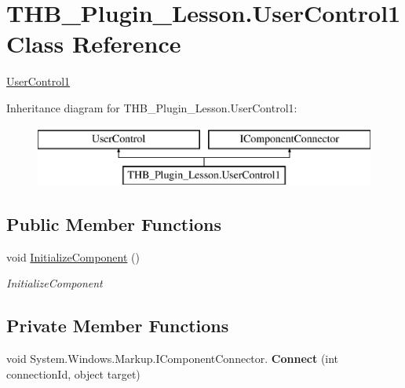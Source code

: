 \hypertarget{class_t_h_b___plugin___lesson_1_1_user_control1}{}\section{T\+H\+B\+\_\+\+Plugin\+\_\+\+Lesson.\+User\+Control1 Class Reference}
\label{class_t_h_b___plugin___lesson_1_1_user_control1}


\mbox{\hyperlink{class_t_h_b___plugin___lesson_1_1_user_control1}{User\+Control1}}  


Inheritance diagram for T\+H\+B\+\_\+\+Plugin\+\_\+\+Lesson.\+User\+Control1\+:\begin{figure}[H]
\begin{center}
\leavevmode
\includegraphics[height=2.000000cm]{d4/dec/class_t_h_b___plugin___lesson_1_1_user_control1}
\end{center}
\end{figure}
\subsection*{Public Member Functions}
\begin{DoxyCompactItemize}
\item 
void \mbox{\hyperlink{class_t_h_b___plugin___lesson_1_1_user_control1_a6b157c1dad624766c5da2c984c9b1368}{Initialize\+Component}} ()
\begin{DoxyCompactList}\small\item\em Initialize\+Component \end{DoxyCompactList}\end{DoxyCompactItemize}
\subsection*{Private Member Functions}
\begin{DoxyCompactItemize}
\item 
\mbox{\label{class_t_h_b___plugin___lesson_1_1_user_control1_a052591678edd4a1701981778548968cf}} 
void System.\+Windows.\+Markup.\+I\+Component\+Connector. {\bfseries Connect} (int connection\+Id, object target)
\end{DoxyCompactItemize}
